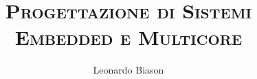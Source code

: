 \documentclass[]{../../../NoTeX/notex}
\title{\textsc{Progettazione di Sistemi Embedded e Multicore}}
\author{Leonardo Biason}
\begin{document}
\maketitle


\pagebreak

\end{document}
